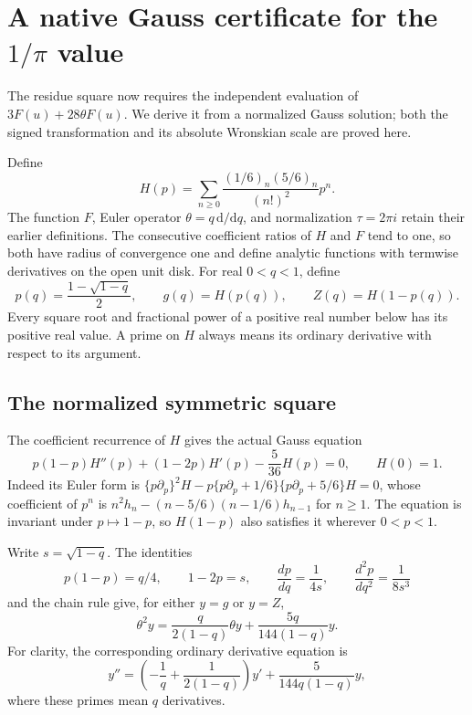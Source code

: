 \documentclass[11pt,a4paper]{article}
\newcommand{\dd}{\mathrm d}
\begin{document}
\section{A native Gauss certificate for the \texorpdfstring{$1/\pi$}{1/pi} value}
\label{sec:native-gauss-certificate}

The residue square now requires the independent evaluation of
$3F(u)+28\theta F(u)$. We derive it from a normalized Gauss solution;
both the signed transformation and its absolute Wronskian scale are
proved here.

Define
\begin{equation}\label{eq:gauss-definitions}
 H(p)=\sum_{n\geq0}\frac{(1/6)_n(5/6)_n}{(n!)^2}p^n.
\end{equation}
The function $F$, Euler operator $\theta=q\,\dd/\dd q$, and normalization
$\tau=2\pi i$ retain their earlier definitions. The consecutive
coefficient ratios of $H$ and $F$ tend to one, so both have radius of
convergence one and define analytic functions with termwise derivatives
on the open unit disk.
For real $0<q<1$, define
\begin{equation}\label{eq:gauss-p-g-Z}
 p(q)=\frac{1-\sqrt{1-q}}2,
 \qquad g(q)=H(p(q)),\qquad Z(q)=H(1-p(q)).
\end{equation}
Every square root and fractional power of a positive real number below
has its positive real value.  A prime on $H$ always means its ordinary
derivative with respect to its argument.

\subsection{The normalized symmetric square}

The coefficient recurrence of $H$ gives the actual Gauss equation
\begin{equation}\label{eq:gauss-ordinary-equation}
 p(1-p)H''(p)+(1-2p)H'(p)-\frac5{36}H(p)=0,
 \qquad H(0)=1.
\end{equation}
Indeed its Euler form is
$\{p\partial_p\}^2H-p\{p\partial_p+1/6\}
\{p\partial_p+5/6\}H=0$, whose coefficient of $p^n$ is
$n^2h_n-(n-5/6)(n-1/6)h_{n-1}$ for $n\geq1$.
The equation is invariant under $p\mapsto1-p$, so $H(1-p)$ also
satisfies it wherever $0<p<1$.

Write $s=\sqrt{1-q}$.  The identities
\[
 p(1-p)=q/4,\qquad 1-2p=s,\qquad
 \frac{dp}{dq}=\frac1{4s},\qquad
 \frac{d^2p}{dq^2}=\frac1{8s^3}
\]
and the chain rule give, for either $y=g$ or $y=Z$,
\begin{equation}\label{eq:gauss-native}
 \theta^2y=\frac{q}{2(1-q)}\theta y+
                 \frac{5q}{144(1-q)}y.
\end{equation}
For clarity, the corresponding ordinary derivative equation is
\[
 y''=\left(-\frac1q+\frac1{2(1-q)}\right)y'
                   +\frac5{144q(1-q)}y,
\]
where these primes mean $q$ derivatives.
\end{document}
